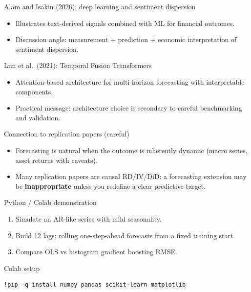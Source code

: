 \documentclass[aspectratio=169,11pt]{beamer}
\begin{document}
\begin{frame}{Alam and Isakin (2026): deep learning and sentiment dispersion}
  \begin{itemize}
    \item Illustrates text-derived signals combined with ML for financial outcomes.
    \item Discussion angle: measurement + prediction + economic interpretation of sentiment dispersion.
  \end{itemize}
\end{frame}

\begin{frame}{Lim et al.\ (2021): Temporal Fusion Transformers}
  \begin{itemize}
    \item Attention-based architecture for multi-horizon forecasting with interpretable components.
    \item Practical message: architecture choice is secondary to careful benchmarking and validation.
  \end{itemize}
\end{frame}

\begin{frame}{Connection to replication papers (careful)}
  \begin{itemize}
    \item Forecasting is natural when the outcome is inherently dynamic (macro series, asset returns with caveats).
    \item Many replication papers are causal RD/IV/DiD: a forecasting extension may be \textbf{inappropriate} unless you redefine a clear predictive target.
  \end{itemize}
\end{frame}

\begin{frame}{Python / Colab demonstration}
  \begin{enumerate}
    \item Simulate an AR-like series with mild seasonality.
    \item Build 12 lags; rolling one-step-ahead forecasts from a fixed training start.
    \item Compare OLS vs histogram gradient boosting RMSE.
  \end{enumerate}
\end{frame}

\begin{frame}[fragile]{Colab setup}
  \begin{verbatim}
!pip -q install numpy pandas scikit-learn matplotlib
  \end{verbatim}
\end{frame}
\end{document}
